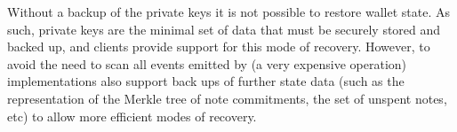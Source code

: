 Without a backup of the private keys it is not possible to restore wallet state. As such, private keys are the minimal set of data that must be securely stored and backed up, and clients \SHOULD{} provide support for this mode of recovery. However, to avoid the need to scan all events emitted by \mixer{} (a very expensive operation) implementations \SHOULD{} also support back ups of further state data (such as the representation of the Merkle tree of note commitments, the set of unspent notes, etc) to allow more efficient modes of recovery.
